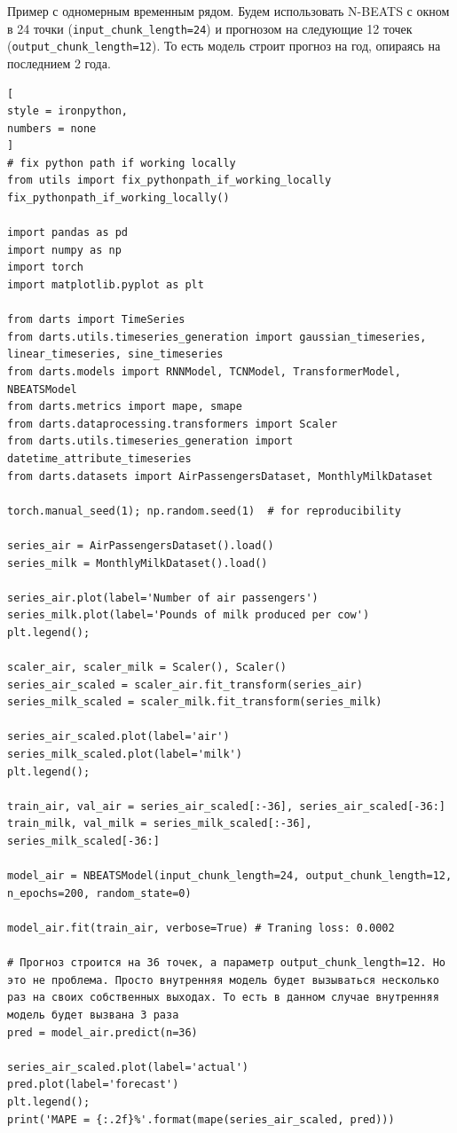\documentclass[%
	11pt,
	a4paper,
	utf8,
		]{article}
\begin{document}
Пример с одномерным временным рядом. Будем использовать N-BEATS с окном в 24 точки (\texttt{input\_chunk\_length=24}) и прогнозом на следующие 12 точек (\texttt{output\_chunk\_length=12}). То есть модель строит прогноз на год, опираясь на последнием 2 года.

\begin{lstlisting}[
style = ironpython,
numbers = none	
]
# fix python path if working locally
from utils import fix_pythonpath_if_working_locally
fix_pythonpath_if_working_locally()

import pandas as pd
import numpy as np
import torch
import matplotlib.pyplot as plt

from darts import TimeSeries
from darts.utils.timeseries_generation import gaussian_timeseries, linear_timeseries, sine_timeseries
from darts.models import RNNModel, TCNModel, TransformerModel, NBEATSModel
from darts.metrics import mape, smape
from darts.dataprocessing.transformers import Scaler
from darts.utils.timeseries_generation import datetime_attribute_timeseries
from darts.datasets import AirPassengersDataset, MonthlyMilkDataset

torch.manual_seed(1); np.random.seed(1)  # for reproducibility

series_air = AirPassengersDataset().load()
series_milk = MonthlyMilkDataset().load()

series_air.plot(label='Number of air passengers')
series_milk.plot(label='Pounds of milk produced per cow')
plt.legend();

scaler_air, scaler_milk = Scaler(), Scaler()
series_air_scaled = scaler_air.fit_transform(series_air)
series_milk_scaled = scaler_milk.fit_transform(series_milk)

series_air_scaled.plot(label='air')
series_milk_scaled.plot(label='milk')
plt.legend();

train_air, val_air = series_air_scaled[:-36], series_air_scaled[-36:]
train_milk, val_milk = series_milk_scaled[:-36], series_milk_scaled[-36:]

model_air = NBEATSModel(input_chunk_length=24, output_chunk_length=12, n_epochs=200, random_state=0)

model_air.fit(train_air, verbose=True) # Traning loss: 0.0002

# Прогноз строится на 36 точек, а параметр output_chunk_length=12. Но это не проблема. Просто внутренняя модель будет вызываться несколько раз на своих собственных выходах. То есть в данном случае внутренняя модель будет вызвана 3 раза
pred = model_air.predict(n=36)

series_air_scaled.plot(label='actual')
pred.plot(label='forecast')
plt.legend();
print('MAPE = {:.2f}%'.format(mape(series_air_scaled, pred)))
\end{lstlisting}
\end{document}
